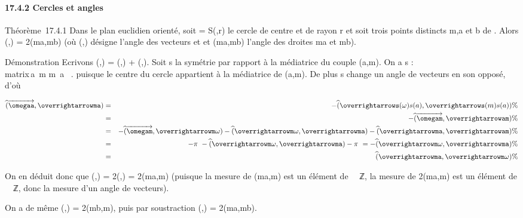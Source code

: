 \paragraph{17.4.2 Cercles et angles}

Théorème~17.4.1 Dans le plan euclidien orienté, soit \Gamma = S(\omega,r) le
cercle de centre \omega et de rayon r et soit trois points distincts m,a et b
de \Gamma. Alors
\widehat(\overrightarrow\omegaa,\overrightarrow\omegab)
= 2\widehat(ma,mb) (où
\widehat(\overrightarrow\omegaa,\overrightarrow\omegab)
désigne l'angle des vecteurs \overrightarrow\omegaa et
\overrightarrow\omegab et
\widehat(ma,mb) l'angle des droites ma et mb).

Démonstration Ecrivons
\widehat(\overrightarrow\omegaa,\overrightarrowm\omega)
=\widehat
(\overrightarrow\omegaa,\overrightarrowma)
+\widehat
(\overrightarrowma,\overrightarrowm\omega).
Soit s la symétrie par rapport à la médiatrice du couple (a,m). On a s :
\left
\\matrix\,a\mapsto~m
\cr m\mapsto~a \cr
\omega\mapsto~\omega\right . puisque le
centre du cercle appartient à la médiatrice de (a,m). De plus s change
un angle de vecteurs en son opposé, d'où

\begin{align*}
\widehat(\overrightarrow\omegaa,\overrightarrowma)&
=&
-\widehat(\overrightarrows(\omega)s(a),\overrightarrows(m)s(a))
\%& \\ & =&
-\widehat(\overrightarrow\omegam,\overrightarrowam)
\%& \\ & =&
-\widehat(\overrightarrow\omegam,\overrightarrowm\omega)
-\widehat
(\overrightarrowm\omega,\overrightarrowma)
-\widehat
(\overrightarrowma,\overrightarrowam)\%&
\\ & =& -\pi~ -\widehat
(\overrightarrowm\omega,\overrightarrowma)
- \pi~ =
-\widehat(\overrightarrowm\omega,\overrightarrowma)
\%& \\ & =&
\widehat(\overrightarrowma,\overrightarrowm\omega)
\%& \\ \end{align*}

On en déduit donc que
\widehat(\overrightarrow\omegaa,\overrightarrowm\omega)
=
2\widehat(\overrightarrowma,\overrightarrowm\omega)
= 2\widehat(ma,m\omega) (puisque la mesure de
\widehat(ma,m\omega) est un élément de ~\diagup\pi~ℤ, la mesure de
2\widehat(ma,m\omega) est un élément de ~\pi~ℤ, donc la
mesure d'un angle de vecteurs).

On a de même
\widehat(\overrightarrow\omegab,\overrightarrowm\omega)
= 2\widehat(mb,m\omega), puis par soustraction
\widehat(\overrightarrow\omegaa,\overrightarrow\omegab)
= 2\widehat(ma,mb).


